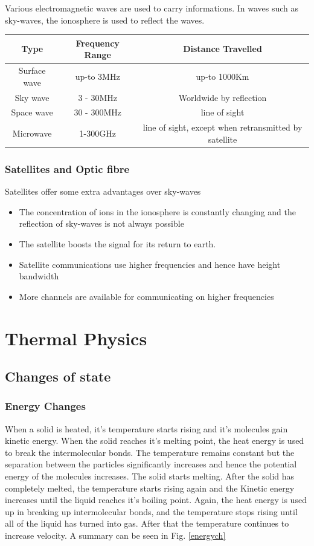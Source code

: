 \documentclass{scrbook}
\begin{document}
	Various electromagnetic waves are used to carry informations. In waves such as sky-waves, the ionosphere is used to reflect the waves.

	\begin{tabular}{| c | c | c |}
		\hline
		Type & Frequency Range & Distance Travelled \\
		\hline
		Surface wave & up-to 3MHz & up-to 1000Km \\
		Sky wave & 3 - 30MHz & Worldwide by reflection \\
		Space wave & 30 - 300MHz & line of sight \\
		Microwave & 1-300GHz & line of sight, except when retransmitted by satellite \\
		\hline
	\end{tabular}

\subsection{Satellites and Optic fibre}

	Satellites offer some extra advantages over sky-waves

	\begin{itemize}
		\item
			The concentration of ions in the ionosphere is constantly changing and the reflection of sky-waves is not always possible
		\item
			The satellite boosts the signal for its return to earth.
		\item
			Satellite communications use higher frequencies and hence have height bandwidth
		\item
			More channels are available for communicating on higher frequencies
	\end{itemize}

\chapter{Thermal Physics}

\section{Changes of state}

\subsection{Energy Changes}

       When a solid is heated, it's temperature starts rising and it's molecules gain kinetic energy. When the solid reaches it's melting point, the heat energy is used to break the intermolecular bonds. The temperature remains constant but the separation between the particles significantly increases and hence the potential energy of the molecules increases. The solid starts melting. After the solid has completely melted, the temperature starts rising again and the Kinetic energy increases until the liquid reaches it's boiling point. Again, the heat energy is used up in breaking up intermolecular bonds, and the temperature stops rising until all of the liquid has turned into gas. After that the temperature continues to increase velocity. A summary can be seen in Fig. \ref{energych}
\end{document}
